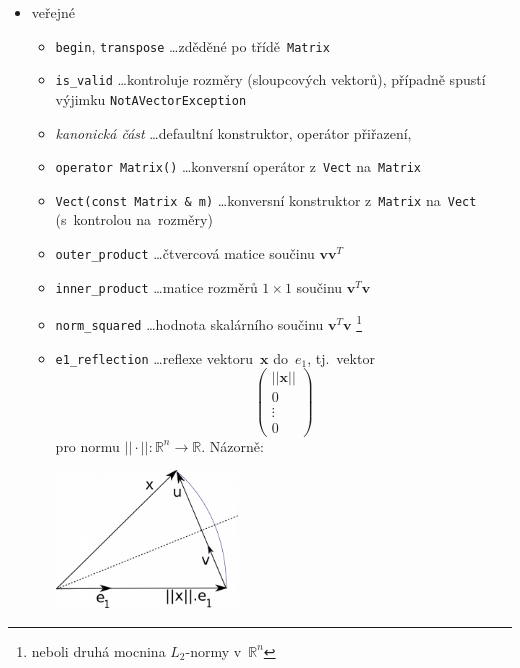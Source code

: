 \documentclass[11pt,a4paper]{article}
\newcommand{\R}{\mathbb{R}}
\newcommand{\V}{\mathbf{v}}
\newcommand{\x}{\mathbf{x}}
\theoremstyle{remark}
\begin{document}
\begin{itemize}
  \item veřejné
  \begin{itemize}
    \item \verb=begin=, \verb=transpose= \ldots zděděné po třídě~\verb=Matrix=
    \item \verb=is_valid= \ldots kontroluje rozměry (sloupcových vektorů),
      případně spustí výjimku \verb=NotAVectorException=
    \item \emph{kanonická část\/} \ldots defaultní konstruktor, operátor
      přiřazení, 
    \item \verb=operator Matrix()= \ldots konversní operátor z~\verb=Vect=
      na~\verb=Matrix=
    \item \verb=Vect(const Matrix & m)= \ldots konversní konstruktor
      z~\verb=Matrix= na~\verb=Vect= (s~kontrolou na~rozměry)
    \item \verb=outer_product= \ldots čtvercová matice součinu $\V\V^T$
    \item \verb=inner_product= \ldots matice rozměrů $1\times 1$ součinu
      $\V^T\V$
    \item \verb=norm_squared= \ldots hodnota skalárního součinu
      $\V^T\V$\thinspace%
      \footnote{neboli druhá mocnina $L_2$-normy v~$\R^n$}
    \item \verb=e1_reflection= \ldots reflexe vektoru~$\x$ do~$e_1$, tj.~vektor
      \[
        \begin{pmatrix}
          ||\x|| \\
          0 \\
          \vdots \\
          0
        \end{pmatrix}
      \]
      pro normu $||\cdot||\colon \R^n \to \R$.
      Názorně:

      \begin{center}
      \includegraphics[width=0.4\textwidth]{./householder_reflection.png}
      \end{center}


\end{itemize}
\end{itemize}
\end{document}
